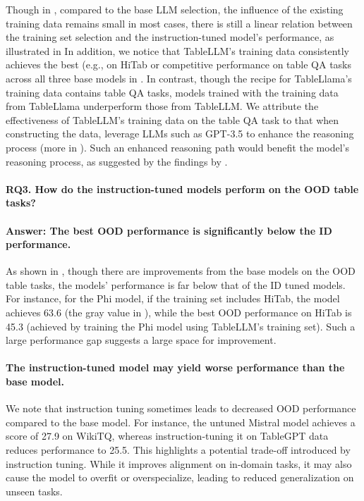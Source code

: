\documentclass[11pt]{article}
\begin{document}
Though in , compared to the base LLM selection, the influence of the existing training data remains small in most cases, there is still a linear relation between the training set selection and the instruction-tuned model's performance, as illustrated in 
In addition, we notice that TableLLM's training data consistently achieves the best (e.g., on HiTab or competitive performance on table QA tasks across all three base models in .
In contrast, though the recipe for TableLlama's training data contains table QA tasks, models trained with the training data from TableLlama underperform those from TableLLM.
We attribute the effectiveness of TableLLM's training data on the table QA task to that when constructing the data, \citet{zhang2024tablellm} leverage LLMs such as GPT-3.5 to enhance the reasoning process (more in ).
Such an enhanced reasoning path would benefit the model's reasoning process, as suggested by the findings by \citet{guo2025deepseek, muennighoff2025s1}.



\paragraph{RQ3. How do the instruction-tuned models perform on the OOD table tasks? }

\paragraph{Answer: The best OOD performance is significantly below the ID performance.}
As shown in , though there are improvements from the base models on the OOD table tasks, the models' performance is far below that of the ID tuned models.
For instance, for the Phi model, if the training set includes HiTab, the model achieves 63.6 (the gray value in ), while the best OOD performance on HiTab is 45.3 (achieved by training the Phi model using TableLLM's training set).
Such a large performance gap suggests a large space for improvement.

\paragraph{The instruction-tuned model may yield worse performance than the base model.}
We note that instruction tuning sometimes leads to decreased OOD performance compared to the base model.
For instance, the untuned Mistral model achieves a score of 27.9 on WikiTQ, whereas instruction-tuning it on TableGPT data reduces performance to 25.5. 
This highlights a potential trade-off introduced by instruction tuning.
While it improves alignment on in-domain tasks, it may also cause the model to overfit or overspecialize, leading to reduced generalization on unseen tasks.
\end{document}
